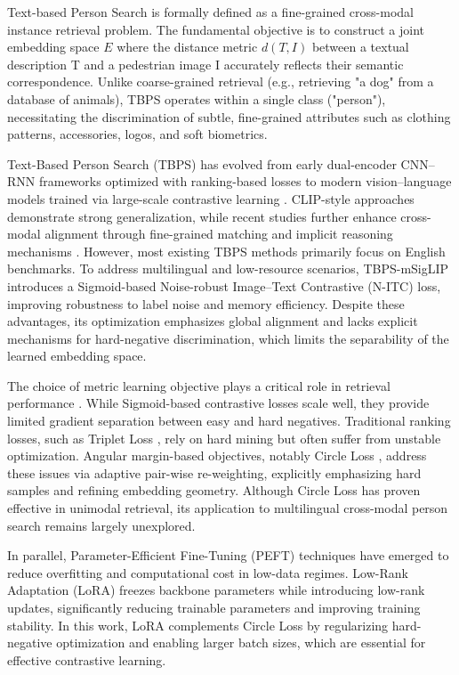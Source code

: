\documentclass[../main.tex]{subfiles}
\begin{document}
Text-based Person Search is formally defined as a fine-grained cross-modal instance retrieval problem. The fundamental objective is to construct a joint embedding space $E$ where the distance metric $d(T,I)$ between a textual description T and a pedestrian image I accurately reflects their semantic correspondence. Unlike coarse-grained retrieval (e.g., retrieving "a dog" from a database of animals), TBPS operates within a single class ("person"), necessitating the discrimination of subtle, fine-grained attributes such as clothing patterns, accessories, logos, and soft biometrics.

Text-Based Person Search (TBPS) has evolved from early dual-encoder CNN–RNN frameworks optimized with ranking-based losses \cite{Zhang_2018_ECCV,Li_2017_CVPR} to modern vision–language models trained via large-scale contrastive learning \cite{pmlr-v139-radford21a}. CLIP-style approaches demonstrate strong generalization, while recent studies further enhance cross-modal alignment through fine-grained matching and implicit reasoning mechanisms \cite{jiang2023cross,yin2025cross}. However, most existing TBPS methods primarily focus on English benchmarks. To address multilingual and low-resource scenarios, TBPS-mSigLIP \cite{Tran2025multilingual} introduces a Sigmoid-based Noise-robust Image--Text Contrastive (N-ITC) loss, improving robustness to label noise and memory efficiency. Despite these advantages, its optimization emphasizes global alignment and lacks explicit mechanisms for hard-negative discrimination, which limits the separability of the learned embedding space.

The choice of metric learning objective plays a critical role in retrieval performance \cite{kulis2013metric}. While Sigmoid-based contrastive losses scale well, they provide limited gradient separation between easy and hard negatives. Traditional ranking losses, such as Triplet Loss \cite{schroff2015facenet}, rely on hard mining but often suffer from unstable optimization. Angular margin-based objectives, notably Circle Loss \cite{sun2020circle}, address these issues via adaptive pair-wise re-weighting, explicitly emphasizing hard samples and refining embedding geometry. Although Circle Loss has proven effective in unimodal retrieval, its application to multilingual cross-modal person search remains largely unexplored.

In parallel, Parameter-Efficient Fine-Tuning (PEFT) techniques have emerged to reduce overfitting and computational cost in low-data regimes. Low-Rank Adaptation (LoRA) \cite{hu2022lora} freezes backbone parameters while introducing low-rank updates, significantly reducing trainable parameters and improving training stability. In this work, LoRA complements Circle Loss by regularizing hard-negative optimization and enabling larger batch sizes, which are essential for effective contrastive learning.
\end{document}
